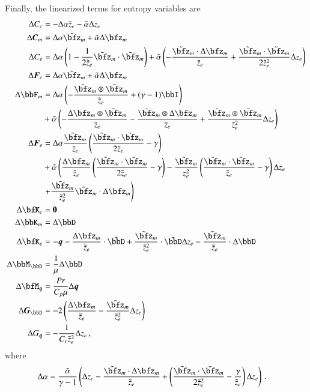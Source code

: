 \documentclass[preprint,12pt]{elsarticle}
\begin{document}
Finally, the linearized terms for entropy variables are
\begin{align*}
\Delta C_c&=-\Delta\alpha\tilde z_e-\tilde\alpha\Delta z_e\\
\Delta\bfC_m&=\Delta\alpha\tilde\bfz_m+\tilde\alpha\Delta\bfz_m\\
\Delta C_e&=\Delta\alpha\LRp{1-\frac{1}{2\tilde z_e}\tilde\bfz_m\cdot\tilde\bfz_m}
+\tilde\alpha\LRp{-\frac{\tilde\bfz_m\cdot\Delta\bfz_m}{\tilde z_e}
+\frac{\tilde\bfz_m\cdot\tilde\bfz_m}{2\tilde z_e^2}\Delta z_e}\\
%
\Delta\bfF_c&=\Delta\alpha\tilde\bfz_m+\tilde\alpha\Delta\bfz_m\\
\Delta\bbF_m&=
\Delta\alpha\LRp{-\frac{\tilde\bfz_m\otimes\tilde\bfz_m}{\tilde z_e}+(\gamma-1)\bbI}\\
&+\tilde\alpha\LRp{
-\frac{\Delta\bfz_m\otimes\tilde\bfz_m}{\tilde z_e}
-\frac{\tilde\bfz_m\otimes\Delta\bfz_m}{\tilde z_e}
+\frac{\tilde\bfz_m\otimes\tilde\bfz_m}{\tilde z_e^2}\Delta z_e
}\\
\Delta\bfF_e&=
\Delta\alpha\frac{\tilde\bfz_m}{\tilde z_e}\LRp{\frac{\tilde\bfz_m\cdot\tilde\bfz_m}{2\tilde z_e}-\gamma}\\
&+\tilde\alpha\LRp{
\frac{\Delta\bfz_m}{\tilde z_e}\LRp{\frac{\tilde\bfz_m\cdot\tilde\bfz_m}{2\tilde z_e}-\gamma}
-\frac{\tilde\bfz_m}{z_e^2}\LRp{\frac{\tilde\bfz_m\cdot\tilde\bfz_m}{\tilde z_e}-\gamma}\Delta z_e\right.\\
&\left.
+\frac{\tilde\bfz_m}{\tilde z_e^2}
\tilde\bfz_m\cdot\Delta\bfz_m
}\\
%
\Delta\bfK_c&=\bs0\\
\Delta\bbK_m&=\Delta\bbD\\
\Delta\bfK_e&=-\bfq-\frac{\Delta\bfz_m}{\tilde z_e}\cdot\tilde\bbD
+\frac{\tilde\bfz_m}{\tilde z_e^2}\cdot\tilde\bbD\Delta z_e
-\frac{\tilde\bfz_m}{\tilde z_e}\cdot\Delta\bbD\\
%
\Delta\bbM_\bbD&=\frac{1}{\mu}\Delta \bbD\\
\Delta\bfM_{\bfq}&=\frac{Pr}{C_p\mu}\Delta\bfq\\
\Delta\bfG_{\bbD}&=-2\LRp{\frac{\Delta\bfz_m}{\tilde z_e}-\frac{\tilde\bfz_m}{\tilde z_e^2}\Delta z_e}\\
\Delta G_{\bfq}&=-\frac{1}{C_v\tilde z_e^2}\Delta z_e\,,
\end{align*}
where
\begin{align*}
\Delta\alpha&=
\frac{\tilde\alpha}{\gamma-1}\LRp{\Delta z_c-\frac{\tilde\bfz_m\cdot\Delta\bfz_m}{\tilde z_e}
+\LRp{\frac{\tilde\bfz_m\cdot\tilde\bfz_m}{2\tilde z_e^2}-\frac{\gamma}{\tilde z_e}}\Delta z_e}\,.
\end{align*}
\end{document}
